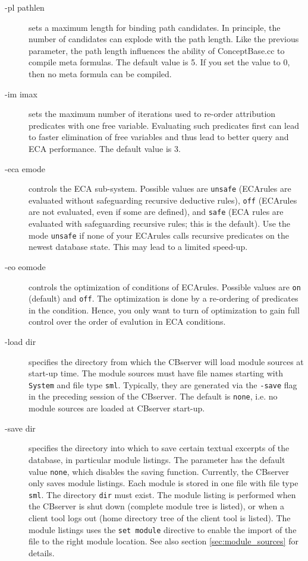 \begin{description}
\item[-pl pathlen] sets a maximum length for binding path candidates. In principle,
the number of candidates can explode with the path length. Like the previous parameter,
the path length influences the ability of ConceptBase.cc to compile meta formulas. The
default value is 5. If you set the value to 0, then no meta formula can be compiled.

\item[-im imax] sets the maximum number of iterations used to re-order attribution 
predicates with one free variable. Evaluating such predicates first can lead
to faster elimination of free variables and thus lead to better query and ECA
performance. The default value is 3.

\item[-eca emode] controls the ECA sub-system. Possible values are {\tt unsafe}
(ECArules are evaluated without safeguarding
recursive deductive rules), {\tt off}
(ECArules are not evaluated, even if some are defined), and {\tt safe}
(ECA rules are evaluated with safeguarding recursive rules; this is the default).
Use the mode {\tt unsafe} if none of your ECArules calls recursive predicates
on the newest database state. This may lead to a limited speed-up.

\item[-eo eomode] controls the optimization of conditions of ECArules.
Possible values are {\tt on} (default) and {\tt off}. The optimization is done by
a re-ordering of predicates in the condition. Hence, you only want to turn of
optimization to gain full control over the order of evalution in ECA conditions.

\item[-load dir] specifies the directory from which the CBserver will load
module sources at start-up time. The module sources must have file names
starting with {\tt System} and file type {\tt sml}. Typically, they are
generated via the {\tt -save} flag in the preceding session of the CBserver.
The default is {\tt none}, i.e. no module sources are loaded at CBserver
start-up.

\item[-save dir] specifies the directory into which to save certain textual
excerpts of the database, in particular module listings. The parameter has the
default value {\tt none}, which disables the saving function. Currently,
the CBserver only saves module listings. Each module is stored in one
file with file type {\tt sml}. The directory {\tt dir} must exist.
The module listing is performed when the CBserver is shut down (complete module
tree is listed), or when a client tool logs out (home directory tree of
the client tool is listed). The module listings uses the {\tt set module}
directive to enable the import of the file to the right module location.
See also section \ref{sec:module_sources} for details.



\end{description}
